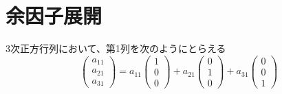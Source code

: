 \documentclass[../../../topic_linear-algebra]{subfiles}
\begin{document}
\sectionline
\section{余因子展開}

3次正方行列において、第1列を次のようにとらえる
\begin{equation*}
  \begin{pmatrix}
    a_{11} \\
    a_{21} \\
    a_{31}
  \end{pmatrix} = a_{11} \begin{pmatrix}
    1 \\
    0 \\
    0
  \end{pmatrix} + a_{21} \begin{pmatrix}
    0 \\
    1 \\
    0
  \end{pmatrix} + a_{31} \begin{pmatrix}
    0 \\
    0 \\
    1
  \end{pmatrix}
\end{equation*}
\end{document}
